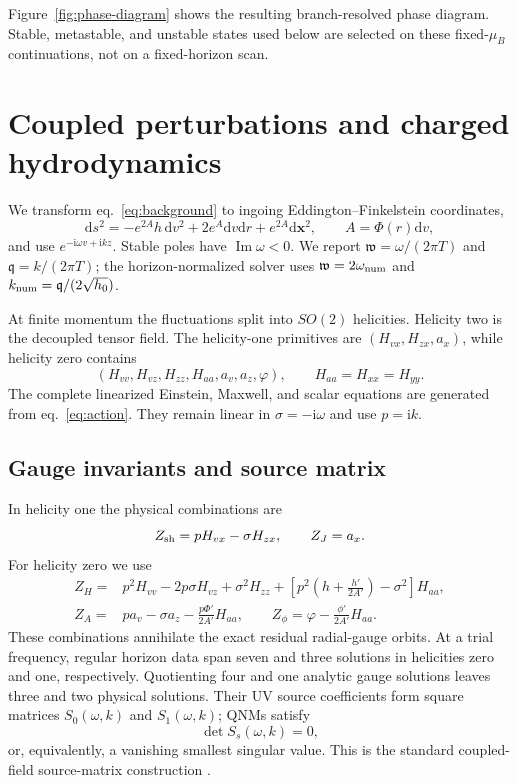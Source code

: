 \documentclass[11pt,a4paper]{article}
\newcommand{\dd}{\mathrm{d}}
\newcommand{\ii}{\mathrm{i}}
\newcommand{\mub}{\mu_B}
\newcommand{\w}{\mathfrak{w}}
\newcommand{\q}{\mathfrak{q}}
\begin{document}
Figure~\ref{fig:phase-diagram} shows the resulting branch-resolved phase
diagram.  Stable, metastable, and unstable states used below are selected on
these fixed-$\mub$ continuations, not on a fixed-horizon scan.

\FloatBarrier
\section{Coupled perturbations and charged hydrodynamics}
\label{sec:perturbations}

We transform eq.~\eqref{eq:background} to ingoing Eddington--Finkelstein
coordinates,
\begin{equation}
 \dd s^2=-e^{2A}h\,\dd v^2+2e^A\dd v\dd r+e^{2A}\dd\bm{x}^2,
 \qquad A=\Phi(r)\dd v,
\end{equation}
and use $e^{-\ii\omega v+\ii kz}$.  Stable poles have
$\operatorname{Im}\omega<0$.  We report
$\w=\omega/(2\pi T)$ and $\q=k/(2\pi T)$; the horizon-normalized solver uses
$\w=2\omega_{\rm num}$ and $k_{\rm num}=\q/(2\sqrt{h_0})$.

At finite momentum the fluctuations split into $SO(2)$ helicities.  Helicity
two is the decoupled tensor field.  The helicity-one primitives are
$(H_{vx},H_{zx},a_x)$, while helicity zero contains
\begin{equation}
 (H_{vv},H_{vz},H_{zz},H_{aa},a_v,a_z,\varphi),\qquad
 H_{aa}=H_{xx}=H_{yy}.
\end{equation}
The complete linearized Einstein, Maxwell, and scalar equations are generated
from eq.~\eqref{eq:action}.  They remain linear in
$\sigma=-\ii\omega$ and use $p=\ii k$.

\subsection{Gauge invariants and source matrix}

In helicity one the physical combinations are
\begin{equation}
 Z_{\rm sh}=pH_{vx}-\sigma H_{zx},\qquad Z_J=a_x.
 \label{eq:h1-invariants}
\end{equation}
For helicity zero we use
\begin{align}
 Z_H={}&p^2H_{vv}-2p\sigma H_{vz}+\sigma^2H_{zz}
 +\left[p^2\left(h+\frac{h'}{2A'}\right)-\sigma^2\right]H_{aa},\nonumber\\
 Z_A={}&p a_v-\sigma a_z-\frac{p\Phi'}{2A'}H_{aa},\qquad
 Z_\phi=\varphi-\frac{\phi'}{2A'}H_{aa}.
 \label{eq:h0-invariants}
\end{align}
These combinations annihilate the exact residual radial-gauge orbits.  At a
trial frequency, regular horizon data span seven and three solutions in
helicities zero and one, respectively.  Quotienting four and one analytic
gauge solutions leaves three and two physical solutions.  Their UV source
coefficients form square matrices $S_0(\omega,k)$ and $S_1(\omega,k)$; QNMs
satisfy
\begin{equation}
 \det S_s(\omega,k)=0,
 \label{eq:source-matrix}
\end{equation}
or, equivalently, a vanishing smallest singular value.  This is the standard
coupled-field source-matrix construction
\cite{Kovtun:2005ev,Kaminski:2009dh}.
\end{document}
